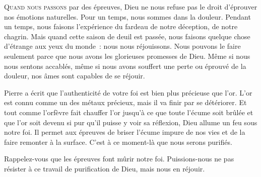 
\lettrine{Q}{uand nous passons} par des épreuves, Dieu ne nous refuse pas
 le droit d'éprouver nos émotions naturelles. Pour un temps, nous sommes
 dans la douleur. Pendant un temps, nous faisons l'expérience du fardeau
 de notre déception, de notre chagrin. Mais quand cette saison de deuil
 est passée, nous faisons quelque chose d'étrange aux yeux du monde~:
 nous nous réjouissons.
 Nous pouvons le faire seulement parce que nous avons les glorieuses
 promesses de Dieu. Même si nous nous sentons accablés,
 même si nous avons souffert une perte ou éprouvé de la douleur,
 nos âmes sont capables de se réjouir.


Pierre a écrit que l'authenticité de votre foi est bien plus précieuse que l'or.
 L'or est connu comme un des métaux précieux, mais il va finir par se détériorer.
 Et tout comme l'orfèvre fait chauffer l'or jusqu'à ce que toute l'écume
 soit brûlée et que l'or soit devenu si pur qu'il puisse y voir sa réflexion,
 Dieu allume un feu sous notre foi. Il permet aux épreuves de briser l'écume
 impure de nos vies et de la faire remonter à la surface.
 C'est à ce moment-là que nous serons purifiés.

Rappelez-vous que les épreuves font mûrir notre foi.
 Puissions-nous ne pas résister à ce travail de purification de Dieu,
 mais nous en réjouir.

\dvrule






